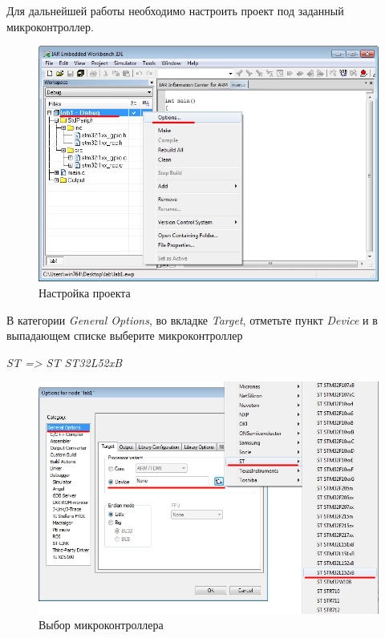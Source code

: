 Для дальнейшей работы необходимо настроить проект под заданный микроконтроллер.

\begin{figure}[h]
\begin{center}
\includegraphics[scale=0.5]{Image/8.jpg}
\end{center}
\caption{Настройка проекта}
\end{figure}

В категории  \textit{ General Options}, во вкладке \textit{Target}, отметьте пункт \textit{Device} и в выпадающем списке выберите микроконтроллер 
\begin{center}
\textit{ST => ST ST32L52xB}
\end{center}

\begin{figure}[H]
\begin{center}
\includegraphics[scale=0.5]{Image/9.jpg}
\end{center}
\caption{Выбор микроконтроллера}
\end{figure}

